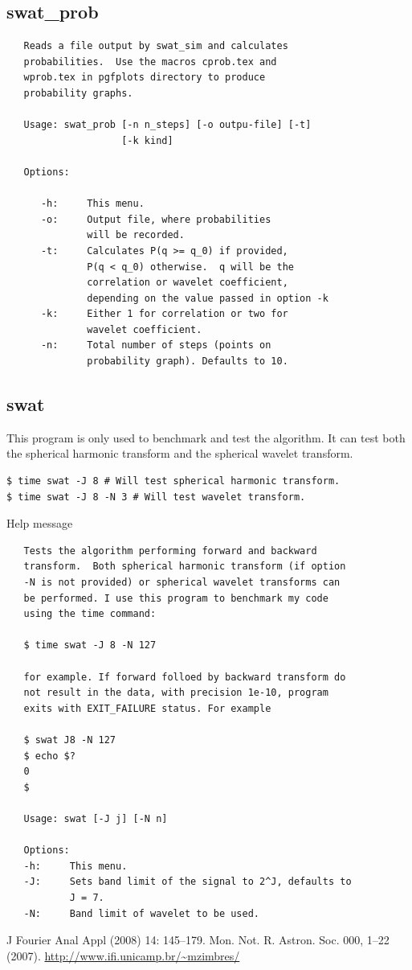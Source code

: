 \documentclass[12pt]{article}
\begin{document}
\subsection{swat\_prob}
{\bf \color{textcolor}
   \begin{lstlisting}
   Reads a file output by swat_sim and calculates
   probabilities.  Use the macros cprob.tex and
   wprob.tex in pgfplots directory to produce
   probability graphs.

   Usage: swat_prob [-n n_steps] [-o outpu-file] [-t] 
                    [-k kind]

   Options:

      -h:     This menu.
      -o:     Output file, where probabilities
              will be recorded.
      -t:     Calculates P(q >= q_0) if provided,
              P(q < q_0) otherwise.  q will be the
              correlation or wavelet coefficient,
              depending on the value passed in option -k
      -k:     Either 1 for correlation or two for
              wavelet coefficient.
      -n:     Total number of steps (points on
              probability graph). Defaults to 10.

   \end{lstlisting}
}

\subsection{swat}
This program is only used to benchmark and test the algorithm. It can test
both the spherical harmonic transform and the spherical wavelet transform.
{\bf \color{textcolor}
\begin{lstlisting}
$ time swat -J 8 # Will test spherical harmonic transform.
$ time swat -J 8 -N 3 # Will test wavelet transform.
\end{lstlisting}
}

Help message
{\bf \color{textcolor}
   \begin{lstlisting}
   Tests the algorithm performing forward and backward
   transform.  Both spherical harmonic transform (if option
   -N is not provided) or spherical wavelet transforms can
   be performed. I use this program to benchmark my code
   using the time command:
   
   $ time swat -J 8 -N 127
   
   for example. If forward folloed by backward transform do
   not result in the data, with precision 1e-10, program
   exits with EXIT_FAILURE status. For example
   
   $ swat J8 -N 127
   $ echo $?
   0
   $
   
   Usage: swat [-J j] [-N n]

   Options: 
   -h:     This menu.
   -J:     Sets band limit of the signal to 2^J, defaults to
           J = 7.
   -N:     Band limit of wavelet to be used.

   \end{lstlisting}
}

\begin{thebibliography}{99}
 J Fourier Anal Appl (2008) 14: 145–179.
 Mon. Not. R. Astron. Soc. 000, 1–22 (2007). 
 \url{http://www.ifi.unicamp.br/~mzimbres/}
\end{thebibliography}
\end{document}
